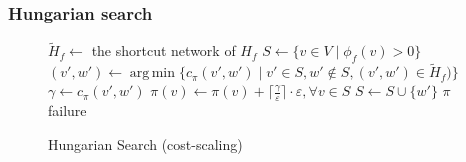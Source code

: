 \documentclass[11pt]{article}
\def\eps{\varepsilon}
\DeclareMathOperator*{\argmin}{arg\,min}
\def\fsupply{\phi}
\theoremstyle{plain}
\numberwithin{figure}{section}
\begin{document}
%
%

\subsubsection{Hungarian search}

\begin{figure*}
\centering
\begin{minipage}{.8\linewidth}
\begin{algorithm}[H]
\caption{Hungarian Search (cost-scaling)}
\begin{algorithmic}[1]
	\State $\tilde{H}_f \gets$ the shortcut network of $H_f$
	\State $S \gets \{v \in V \mid \fsupply_f(v) > 0\}$
	\Repeat
		\State $(v', w') \gets \argmin\{c_\pi(v', w') \mid v' \in S, w' \not\in S, (v', w') \in \tilde{H}_f)\}$
			\label{line:hs_relaxation}
		\State $\gamma \gets c_\pi(v', w')$
			\State $\pi(v) \gets \pi(v) + \lceil\frac{\gamma}{\eps}\rceil\cdot \eps, \forall v \in S$
		\EndIf
		\State $S \gets S \cup \{w'\}$
		\If{$\fsupply_f(w') < 0$} 
			\State\Return $\pi$
		\EndIf
	\State\Return failure
\EndFunction
\end{algorithmic}
\end{algorithm}
\end{minipage}
\end{figure*}
\end{document}
